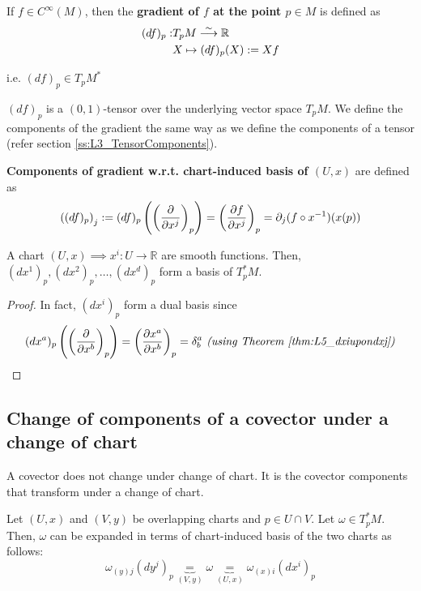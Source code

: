 \begin{definition}
\label{def:gradient}
If $f \in C^{\infty}(M)$, then the \textbf{gradient of $f$ at the point $p \in M$} is defined as
\begin{align}
\label{eq:defGradient}
  (df)_p : & T_p M \linearmapto \mathbb{R} \nonumber \\ 
  & X \mapsto (df)_p(X) := Xf
\end{align}

\end{definition}
i.e. $\boxed{(df)_p \in T_pM^*}$

$(df)_p$ is a $(0,1)$-tensor over the underlying vector space $T_pM$. We define the components of the gradient the same way as we define the components of a tensor (refer section \ref{ss:L3_TensorComponents}).

\begin{definition}
\textbf{Components of gradient w.r.t. chart-induced basis of $(U,x)$} are defined as
\begin{equation}
\left((df)_p \right)_j := (df)_p\left(\left(\cibasis{x^j}\right)_p \right) = \left(\cibasis[f]{x^j}\right)_p = \partial_j (f \after x^{-1})(x(p))
\end{equation}
\end{definition}

\begin{theorem}
A chart $(U,x) \implies x^i : U \to \mathbb{R}$ are smooth functions. Then, $(dx^1)_p, (dx^2)_p, \dotsc, (dx^d)_p$ form a basis of $T_p^*M$. 
\end{theorem}

\begin{proof}
In fact, $(dx^i)_p$ form a dual basis since 
\begin{equation}
(dx^a)_p \left(\left(\cibasis{x^b}\right)_p \right) = \left(\cibasis[x^a]{x^b}\right)_p = \delta_b^a \textit{ (using Theorem \ref{thm:L5_dxiupondxj})}
\end{equation}
\end{proof}

\subsection{Change of components of a covector under a change of chart}
 A covector does not change under change of chart. It is the covector components that transform under a change of chart.

Let $(U,x)$ and $(V,y)$ be overlapping charts and $p \in U \cap V$. Let $\omega \in T_p^*M$. Then, $\omega$ can be expanded in terms of chart-induced basis of the two charts as follows:
\begin{equation}\label{eq:L5_CovecExpandedIn2Charts}
\displaystyle\omega_{(y)j}(dy^j)_p \underbrace{=}_{(V,y)} \omega \underbrace{=}_{(U,x)} \omega_{(x)i}(dx^i)_p
\end{equation}

